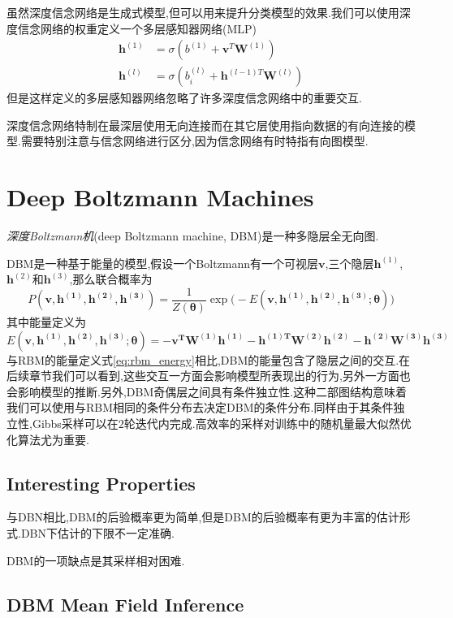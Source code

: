 虽然深度信念网络是生成式模型,但可以用来提升分类模型的效果.我们可以使用深度信念网络的权重定义一个多层感知器网络(MLP)
\begin{equation}\begin{split}
\bm h^{(1)}&=\sigma(b^{(1)}+\bm v^T\bm W^{(1)})\\
\bm h^{(l)}&=\sigma(b_i^{(l)}+\bm h^{(l-1)T}\bm W^{(l)})
\end{split}\end{equation}
但是这样定义的多层感知器网络忽略了许多深度信念网络中的重要交互.

深度信念网络特制在最深层使用无向连接而在其它层使用指向数据的有向连接的模型.需要特别注意与信念网络进行区分,因为信念网络有时特指有向图模型.

\section{Deep Boltzmann Machines}

\textit{深度Boltzmann机}(deep Boltzmann machine, DBM)是一种多隐层全无向图.

DBM是一种基于能量的模型,假设一个Boltzmann有一个可视层$\bm v$,三个隐层$\bm h^{(1)}$,$\bm h^{(2)}$和$\bm h^{(3)}$,那么联合概率为
\begin{equation}
P(\bm{v,h^{(1)},h^{(2)},h^{(3)}})=\frac{1}{Z(\bm\theta)}\exp\Big(-E(\bm{v,h^{(1)},h^{(2)},h^{(3)};\theta})\Big)
\end{equation}
其中能量定义为
\begin{equation}
E(\bm{v,h^{(1)},h^{(2)},h^{(3)};\theta})=\bm{-v^TW^{(1)}h^{(1)}-h^{(1)T}W^{(2)}h^{(2)}-h^{(2)}W^{(3)}h^{(3)}}
\end{equation}
与RBM的能量定义式\ref{eq:rbm_energy}相比,DBM的能量包含了隐层之间的交互.在后续章节我们可以看到,这些交互一方面会影响模型所表现出的行为,另外一方面也会影响模型的推断.另外,DBM奇偶层之间具有条件独立性.这种二部图结构意味着我们可以使用与RBM相同的条件分布去决定DBM的条件分布.同样由于其条件独立性,Gibbs采样可以在$2$轮迭代内完成.高效率的采样对训练中的随机量最大似然优化算法尤为重要.

\subsection{Interesting Properties}

与DBN相比,DBM的后验概率更为简单,但是DBM的后验概率有更为丰富的估计形式.DBN下估计的下限不一定准确.

DBM的一项缺点是其采样相对困难.

\subsection{DBM Mean Field Inference}

